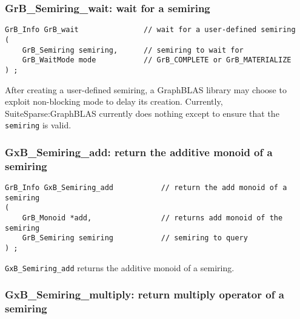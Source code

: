\documentclass[12pt]{article}
\begin{document}
\subsubsection{{\sf GrB\_Semiring\_wait:} wait for a semiring}
\label{semiring_wait}

\begin{mdframed}[userdefinedwidth=6in]
{\footnotesize
\begin{verbatim}
GrB_Info GrB_wait               // wait for a user-defined semiring
(
    GrB_Semiring semiring,      // semiring to wait for
    GrB_WaitMode mode           // GrB_COMPLETE or GrB_MATERIALIZE
) ;
\end{verbatim}
}\end{mdframed}

After creating a user-defined semiring, a GraphBLAS library may choose to
exploit non-blocking mode to delay its creation.  Currently,
SuiteSparse:GraphBLAS currently does nothing except to ensure that the
\verb'semiring' is valid.

\subsubsection{{\sf GxB\_Semiring\_add:} return the additive monoid of a semiring}
\label{semiring_add}

\begin{mdframed}[userdefinedwidth=6in]
{\footnotesize
\begin{verbatim}
GrB_Info GxB_Semiring_add           // return the add monoid of a semiring
(
    GrB_Monoid *add,                // returns add monoid of the semiring
    GrB_Semiring semiring           // semiring to query
) ;
\end{verbatim}
} \end{mdframed}

\verb'GxB_Semiring_add' returns the additive monoid of a semiring.

\newpage
\subsubsection{{\sf GxB\_Semiring\_multiply:} return multiply operator of a semiring}
\label{semiring_multiply}
\end{document}
